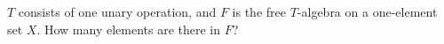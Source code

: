 $T$ consists of one unary operation, and $F$ is the free $T$-algebra on a one-element set $X$. How many elements are there in $F$?
